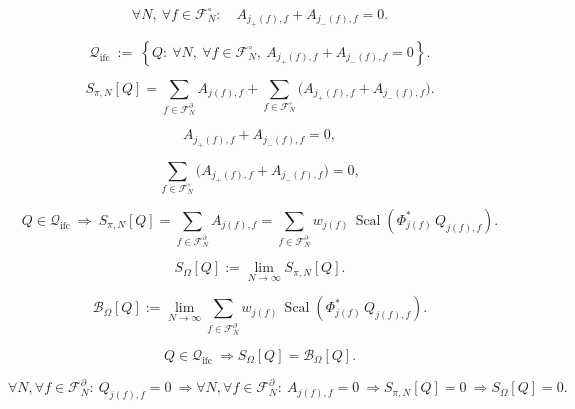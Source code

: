 \documentclass[12pt]{article}
\begin{document}
\begin{equation}
\forall N,\ \forall f\in\mathcal{F}_N^\circ:\quad A_{j_+(f),f}+A_{j_-(f),f}=0.
\end{equation}

\begin{equation}
\boxed{
\mathcal{Q}_{\mathrm{ifc}}
\ :=\ 
\left\{
Q:\ \forall N,\ \forall f\in\mathcal{F}_N^\circ,\
A_{j_+(f),f}+A_{j_-(f),f}=0
\right\}.
}
\end{equation}

\begin{equation}
S_{\pi,N}[Q]
=\sum_{f\in\mathcal{F}_N^\partial}A_{j(f),f}
+\sum_{f\in\mathcal{F}_N^\circ}\Big(A_{j_+(f),f}+A_{j_-(f),f}\Big).
\end{equation}

\begin{equation}
A_{j_+(f),f}+A_{j_-(f),f}=0,
\end{equation}

\begin{equation}
\sum_{f\in\mathcal{F}_N^\circ}\Big(A_{j_+(f),f}+A_{j_-(f),f}\Big)=0,
\end{equation}

\begin{equation}
Q\in\mathcal{Q}_{\mathrm{ifc}}\ \Longrightarrow\
S_{\pi,N}[Q]=\sum_{f\in\mathcal{F}_N^\partial}A_{j(f),f}
=\sum_{f\in\mathcal{F}_N^\partial}w_{j(f)}\,\operatorname{Scal}\!\left(\Phi_{j(f)}^*\,Q_{j(f),f}\right).
\end{equation}

\begin{equation}
S_\Omega[Q]:=\lim_{N\to\infty}S_{\pi,N}[Q].
\end{equation}

\begin{equation}
\mathcal{B}_\Omega[Q]
:=
\lim_{N\to\infty}\sum_{f\in\mathcal{F}_N^\partial}w_{j(f)}\,\operatorname{Scal}\!\left(\Phi_{j(f)}^*\,Q_{j(f),f}\right).
\end{equation}

\begin{equation}
\boxed{
Q\in\mathcal{Q}_{\mathrm{ifc}}
\ \Longrightarrow
S_\Omega[Q]=\mathcal{B}_\Omega[Q].
}
\end{equation}

\begin{equation}
\forall N,\forall f\in\mathcal{F}_N^\partial:\ Q_{j(f),f}=0
\ \Longrightarrow
\forall N,\forall f\in\mathcal{F}_N^\partial:\ A_{j(f),f}=0
\ \Longrightarrow
S_{\pi,N}[Q]=0
\ \Longrightarrow
S_\Omega[Q]=0.
\end{equation}
\end{document}
